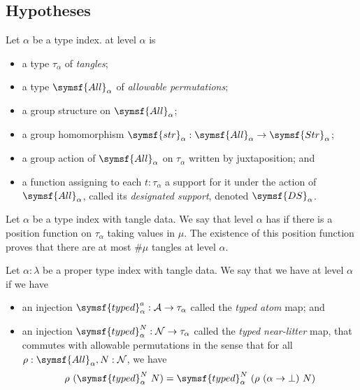 \subsection{Hypotheses}

\begin{definition}
    Let \( \alpha \) be a type index.
     at level \( \alpha \) is
    \begin{itemize}
        \item a type \( \tau_\alpha \) of \emph{tangles};
        \item a type \( \symsf{All}_\alpha \) of \emph{allowable permutations};
        \item a group structure on \( \symsf{All}_\alpha \);
        \item a group homomorphism \( \symsf{str}_\alpha : \symsf{All}_\alpha \to \symsf{Str}_\alpha \);
        \item a group action of \( \symsf{All}_\alpha \) on \( \tau_\alpha \) written by juxtaposition; and
        \item a function assigning to each \( t : \tau_\alpha \) a support for it under the action of \( \symsf{All}_\alpha \), called its \emph{designated support}, denoted \( \symsf{DS}_\alpha \).
    \end{itemize}
\end{definition}
\begin{definition}
    Let \( \alpha \) be a type index with tangle data.
    We say that level \( \alpha \) has  if there is a position function on \( \tau_\alpha \) taking values in \( \mu \).
    The existence of this position function proves that there are at most \( \#\mu \) tangles at level \( \alpha \).
\end{definition}
\begin{definition}
    Let \( \alpha : \lambda \) be a proper type index with tangle data.
    We say that we have  at level \( \alpha \) if we have
    \begin{itemize}
        \item an injection \( \symsf{typed}^a_\alpha : \mathcal A \to \tau_\alpha \) called the \emph{typed atom} map; and
        \item an injection \( \symsf{typed}^N_\alpha : \mathcal N \to \tau_\alpha \) called the \emph{typed near-litter} map, that commutes with allowable permutations in the sense that for all \( \rho : \symsf{All}_\alpha, N : \mathcal N \), we have
        \[ \rho\ (\symsf{typed}^N_\alpha\ N) = \symsf{typed}^N_\alpha\ (\rho\ (\alpha \to \bot)\ N) \]
    \end{itemize}
\end{definition}
